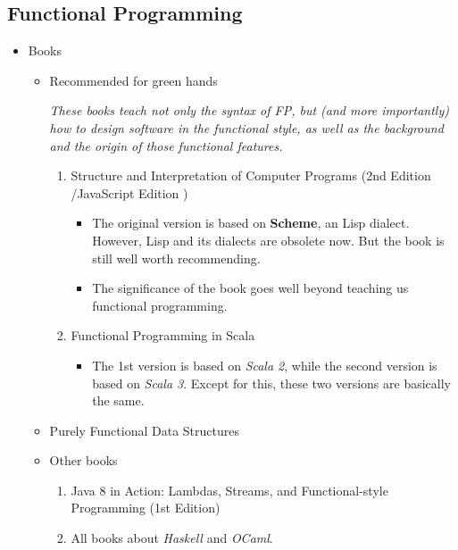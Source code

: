 \documentclass{article}
\begin{document}
\subsection{Functional Programming}
\begin{itemize}
    \item Books
    
    \begin{itemize}
        \item Recommended for green hands
        
        \emph{These books teach not only the syntax of FP, but (and more importantly) how to design software in the functional style, as well as the background and the origin of those functional features.}
        \begin{enumerate}
    \item Structure and Interpretation of Computer Programs (2nd Edition \cite{abelson1996structure}/JavaScript Edition \cite{abelson2022structure})
        \begin{itemize}
            \item The original version is based on \textbf{Scheme}, an Lisp dialect.
            However, Lisp and its dialects are obsolete now.
            But the book is still well worth recommending.
            \item The significance of the book goes well beyond teaching us functional programming.
        \end{itemize}
    \item Functional Programming in Scala
    \cite{chiusano2014functional}
            \begin{itemize}
                \item The 1st version is based on \emph{Scala 2}, while the second version is based on \emph{Scala 3}.
                Except for this, these two versions are basically the same.
            \end{itemize}
        \end{enumerate}
        \item Purely Functional Data Structures
        \cite{okasaki1999purely}
        \item Other books
            \begin{enumerate}
                \item Java 8 in Action: Lambdas, Streams, and Functional-style Programming (1st Edition) \cite{urma2014java}
                \item All books about \emph{Haskell} and \emph{OCaml}.
            \end{enumerate}

\end{itemize}
\end{itemize}
\end{document}
